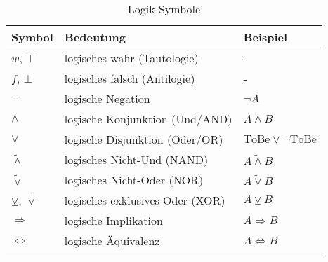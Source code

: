 \documentclass[../main.tex]{subfiles}
\begin{document}
	
	\newcommand{\newNotationRow}{\\[2.5mm]}
	
	\begin{longtable}{p{30mm}p{60mm}p{65mm}} %
		\toprule 
		
		\centering Symbol & Bedeutung & Beispiel \newNotationRow
		
		\midrule
				
		
		\centering $w$, $\top$ & logisches wahr (Tautologie) & - \newNotationRow
		
		\centering $f$, $\bot$ & logisches falsch (Antilogie) & - \newNotationRow
				
		\centering $\lnot$ & logische Negation & $\lnot A$ \newNotationRow
		
		\centering $\land$ & logische Konjunktion (Und/AND) & $A \land B$ \newNotationRow
		
		\centering $\lor$ & logische Disjunktion (Oder/OR) & $\textrm{ToBe} \lor \lnot \textrm{ToBe}$ \newNotationRow
		
		\centering $\tilde\land$ & logisches Nicht-Und (NAND) & $A \tilde\land B$ \newNotationRow
		
		\centering $\tilde\lor$ & logisches Nicht-Oder (NOR) & $A \tilde\lor B$ \newNotationRow
		
		\centering $\veebar$, $\dot{\lor}$ & logisches exklusives Oder (XOR) & $A \veebar B$ \newNotationRow
		
		\centering $\Rightarrow$ & logische Implikation & $A \Rightarrow B$ \newNotationRow
		
		\centering $\Leftrightarrow$ & logische Äquivalenz & $A \Leftrightarrow B$ \newNotationRow
		
		\bottomrule
		
		\caption{Logik Symbole}
	\end{longtable}
\end{document}
